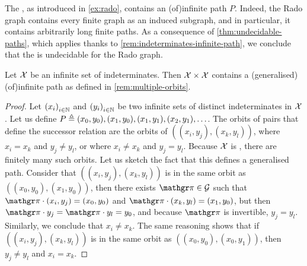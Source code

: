 \begin{example}
  \label{ex:rado-graph-path}
  The , as introduced in \cref{ex:rado},
  contains an \kl(of){infinite path} $P$. Indeed, the Rado graph
  contains every finite graph as an induced subgraph, and in particular,
  it contains arbitrarily long finite paths. 
  As a consequence of \cref{thm:undecidable-paths},
  which applies thanks to \cref{rem:indeterminates-infinite-path},
  we conclude that the 
  is undecidable for the Rado graph.
\end{example}

\begin{example}
  \label{ex:product-indets}
  Let $\mathcal{X}$ be an  infinite set of indeterminates.
  Then $\mathcal{X} \times \mathcal{X}$ contains a (generalised) \kl(of){infinite path}
  as defined in \cref{rem:multiple-orbits}.
\end{example}
\begin{proof}
  Let $\seqof{x_i}[i \in \N]$
  and $\seqof{y_i}[i \in \N]$ be two infinite sets of distinct indeterminates
  in $\mathcal{X}$.
  Let us define $P \triangleq (x_0, y_0), (x_1, y_0), (x_1, y_1), (x_2, y_1), \ldots$.
  The orbits of pairs that define the successor relation 
  are the orbits of $((x_i, y_j), (x_k, y_l))$,
  where $x_i = x_k$ and $y_j \neq y_l$, or where $x_i \neq x_k$ and $y_j = y_l$.
  Because $\mathcal{X}$ is , there are finitely many such orbits.
  Let us sketch the fact that this defines a generalised path.
  Consider that
  $((x_i, y_j), (x_k, y_l))$ is in the same orbit as $((x_0, y_0), (x_1, y_0))$,
  then there exists $\gelem \in \group$ such that
  $\gelem \cdot (x_i, y_j) = (x_0, y_0)$ and $\gelem \cdot (x_k, y_l) = (x_1, y_0)$,
  but then $\gelem \cdot y_j = \gelem \cdot y_l = y_0$, and because $\gelem$ is 
  invertible, $y_j = y_l$. Similarly, we conclude that $x_i \neq x_k$.
  The same reasoning shows that if
  $((x_i, y_j), (x_k, y_l))$ is in the same orbit as $((x_0, y_0), (x_0, y_1))$,
  then $y_j \neq y_l$ and $x_i = x_k$.
\end{proof}


